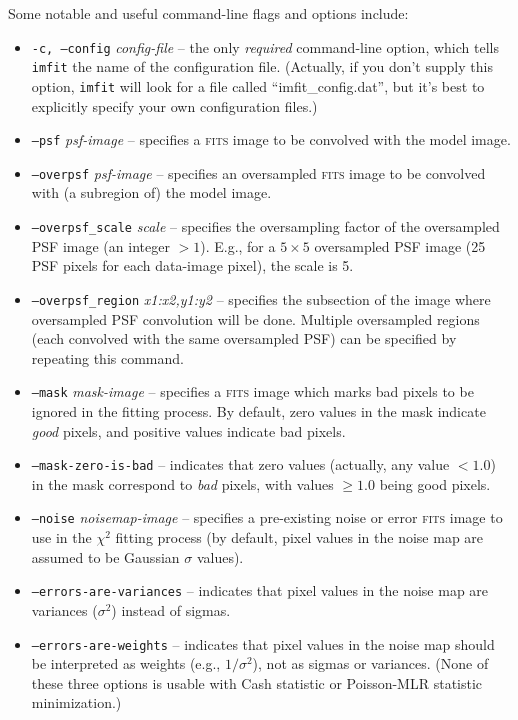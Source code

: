 \documentclass[10pt,a4paper,article]{memoir}
\newcommand{\imfitprog}{\texttt{imfit}}
\newcommand{\chisquare}{\ensuremath{\chi^{2}}}
\begin{document}
Some notable and useful command-line flags and options include:
\begin{itemize}
\item \texttt{-c, --config} \textit{config-file} -- the only \textit{required}
command-line option, which tells \imfitprog{} the name of the configuration file.
(Actually, if you don't supply this option, \imfitprog{} will look for a file
called ``imfit\_config.dat'', but it's best to explicitly specify your own
configuration files.)

\bigskip

\item \texttt{--psf} \textit{psf-image} -- specifies a \textsc{fits} image to be convolved
with the model image.

\bigskip

\item \texttt{--overpsf} \textit{psf-image} -- specifies an oversampled
\textsc{fits} image to be convolved with (a subregion of) the model image.

\item \texttt{--overpsf\_scale} \textit{scale} -- specifies the oversampling
factor of the oversampled PSF image (an integer $> 1$). E.g., for a $5 \times 5$
oversampled PSF image (25 PSF pixels for each data-image pixel), the scale is 5.

\item \texttt{--overpsf\_region} \textit{x1:x2,y1:y2} -- specifies the
subsection of the image where oversampled PSF convolution will be done.
Multiple oversampled regions (each convolved with the same oversampled
PSF) can be specified by repeating this command.

\bigskip

\item \texttt{--mask} \textit{mask-image} -- specifies a \textsc{fits} image which marks
bad pixels to be ignored in the fitting process. By default, zero values in
the mask indicate \textit{good} pixels, and positive values indicate bad pixels.
\item \texttt{--mask-zero-is-bad} -- indicates that zero values (actually,
any value $< 1.0$) in the mask correspond to \textit{bad} pixels, with values
$\geq 1.0$ being good pixels.

\bigskip

\item \texttt{--noise} \textit{noisemap-image} -- specifies a pre-existing noise
or error \textsc{fits} image to use in the \chisquare{} fitting process (by default, pixel values in the
noise map are assumed to be Gaussian $\sigma$ values).
\item \texttt{--errors-are-variances} -- indicates that pixel values in the noise
map are variances ($\sigma^2$) instead of sigmas.
\item \texttt{--errors-are-weights} -- indicates that pixel values in the noise
map should be interpreted as weights (e.g., $1/\sigma^2$), not as sigmas or variances. (None
of these three options is usable with Cash statistic or Poisson-MLR statistic minimization.)


\end{itemize}
\end{document}
